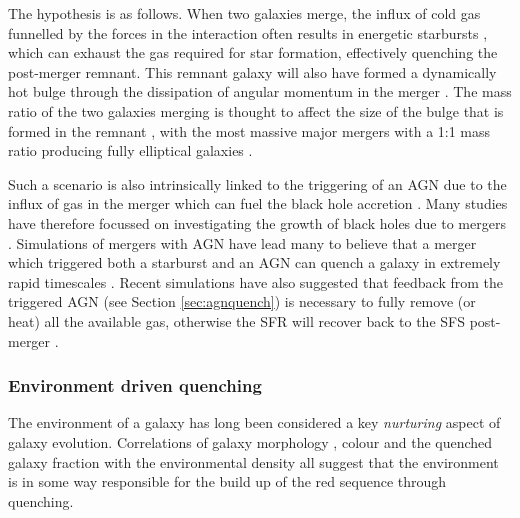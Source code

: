 The hypothesis is as follows. When two galaxies merge, the influx of cold gas funnelled by the forces in the interaction often results in energetic starbursts \citep{mihos94, mihos96, hopkins06d, hopkins08a, hopkins08b, snyder11, hayward14, sparre16}, which can exhaust the gas required for star formation, effectively quenching the post-merger remnant. This remnant galaxy will also have formed a dynamically hot bulge through the dissipation of angular momentum in the merger \citep{toomre77, walker96, kormendy04, hopkins11c, martig12}. The mass ratio of the two galaxies merging is thought to affect the size of the bulge that is formed in the remnant \citep{cox08, hopkins09c, tonini16}, with the most massive major mergers with a 1:1 mass ratio producing fully elliptical galaxies \citep{toomre72, barnes96, mihos96, kauffmann96, pontzen16}.

Such a scenario is also intrinsically linked to the triggering of an AGN due to the influx of gas in the merger which can fuel the black hole accretion \citep{sanders88, dimatteo05, hopkins09a, treister12}. Many studies have therefore focussed on investigating the growth of black holes due to mergers \citep[e.g.][]{veilleux02, bellovary13, ellison13, medling15, gabor16}. Simulations of mergers with AGN have lead many to believe that a merger which triggered both a starburst and an AGN can quench a galaxy in extremely rapid timescales \citep{springel05b, bell06}. Recent simulations have also suggested that feedback from the triggered AGN (see Section \ref{sec:agnquench}) is necessary to fully remove (or heat) all the available gas, otherwise the SFR will recover back to the SFS post-merger \citep{pontzen16, sparre16}. 

\subsubsection{Environment driven quenching}\label{sec:envquench}

The environment of a galaxy has long been considered a key  \emph{nurturing} aspect of galaxy evolution. Correlations of galaxy morphology \citep{dressler80, smail97, poggianti99, postman05, Bamford09}, colour \citep{butcher78, pimbblet02} and the quenched galaxy fraction \citep{kauffmann03, Baldry06, peng12, darvish16} with the environmental density all suggest that the environment is in some way responsible for the build up of the red sequence through quenching. 

